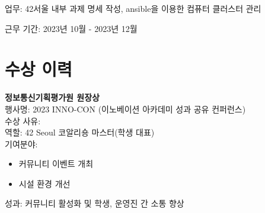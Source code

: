 \documentclass[11pt, a4paper]{article}
\begin{document}
업무: 42서울 내부 과제 명세 작성, ansible을 이용한 컴퓨터 클러스터 관리

근무 기간: 2023년 10월 - 2023년 12월

\section{수상 이력}
\textbf{정보통신기획평가원 원장상}\\
\hspace*{0.5cm}행사명: 2023 INNO-CON (이노베이션 아카데미 성과 공유 컨퍼런스)\\
\hspace*{0.5cm}수상 사유:\\
\hspace*{1cm}역할: 42 Seoul 코알리숑 마스터(학생 대표)\\
\hspace*{1cm}기여분야:
\begin{itemize}
    \begin{itemize}
        \item 커뮤니티 이벤트 개최
        \item 시설 환경 개선
    \end{itemize}
\end{itemize}
\hspace*{0.5cm}성과: 커뮤니티 활성화 및 학생, 운영진 간 소통 향상
\end{document}
